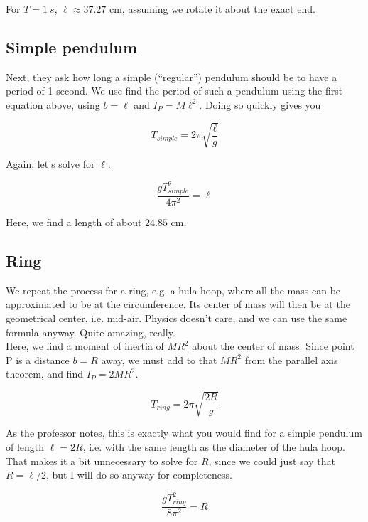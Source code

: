 For $T = \SI{1}{s}$, $\ell \approx 37.27$ cm, assuming we rotate it about the exact end.

\subsection{Simple pendulum}

Next, they ask how long a simple (``regular'') pendulum should be to have a period of 1 second. We use find the period of such a pendulum using the first equation above, using $b = \ell$ and $I_P = M \ell^2$. Doing so quickly gives you

\begin{equation}
T_{simple} = 2 \pi \sqrt{\frac{\ell}{g}}
\end{equation}

Again, let's solve for $\ell$.

\begin{equation}
\frac{g T_{simple}^2}{4 \pi^2} = \ell
\end{equation}

Here, we find a length of about $24.85$ cm.

\subsection{Ring}

We repeat the process for a ring, e.g. a hula hoop, where all the mass can be approximated to be at the circumference. Its center of mass will then be at the geometrical center, i.e. mid-air. Physics doesn't care, and we can use the same formula anyway. Quite amazing, really.\\
Here, we find a moment of inertia of $M R^2$ about the center of mass. Since point P is a distance $b = R$ away, we must add to that $M R^2$ from the parallel axis theorem, and find $I_P = 2 M R^2$.

\begin{equation}
T_{ring} = 2 \pi \sqrt{\frac{2 R}{g}}
\end{equation}

As the professor notes, this is exactly what you would find for a simple pendulum of length $\ell = 2 R$, i.e. with the same length as the diameter of the hula hoop. That makes it a bit unnecessary to solve for $R$, since we could just say that $R = \ell/2$, but I will do so anyway for completeness.

\begin{equation}
\frac{g T_{ring}^2}{8\pi^2} = R
\end{equation}

